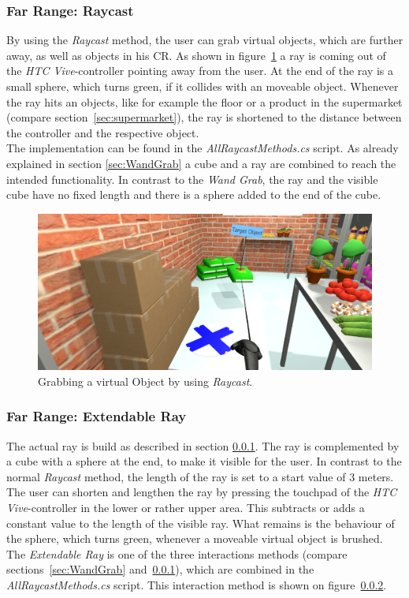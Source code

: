 \subsubsection{Far Range: Raycast} \label{sec:Raycast}
By using the \textit{Raycast} method, the user can grab virtual objects, which are further away, as well as objects in his CR. As shown in figure~\ref{fig:raycast} a ray is coming out of the \textit{HTC Vive}-controller pointing away from the user. At the end of the ray is a small sphere, which turns green, if it collides with an moveable object. Whenever the ray hits an objects, like for example the floor or a product in the supermarket (compare section~\ref{sec:supermarket}), the ray is shortened to the distance between the controller and the respective object. \\
The implementation can be found in the \textit{AllRaycastMethods.cs} script. As already explained in section \ref{sec:WandGrab} a cube and a ray are combined to reach the intended functionality. In contrast to the \textit{Wand Grab}, the ray and the visible cube have no fixed length and there is a sphere added to the end of the cube.

\begin{figure}[H] 
	\center 
	\includegraphics[width=12cm]{Images/Raycast.PNG}			
	\caption[Grabbing a virtual Object by using \textit{Raycast}.]{Grabbing a virtual Object by using \textit{Raycast}.}
	\label{fig:raycast}
\end{figure}


\subsubsection{Far Range: Extendable Ray} \label{sec:ExtendableRay}
The actual ray is build as described in section \ref{sec:Raycast}. The ray \cite{website:Ray} is complemented by a cube with a sphere at the end, to make it visible for the user. In contrast to the normal \textit{Raycast} method, the length of the ray is set to a start value of 3 meters. The user can shorten and lengthen the ray by pressing the touchpad of the \textit{HTC Vive}-controller in the lower or rather upper area. This subtracts or adds a constant value to the length of the visible ray. What remains is the behaviour of the sphere, which turns green, whenever a moveable virtual object is brushed. The \textit{Extendable Ray} is one of the three interactions methods (compare sections~\ref{sec:WandGrab} and~\ref{sec:Raycast}), which are combined in the \textit{AllRaycastMethods.cs} script. This interaction method is shown on figure~\ref{sec:ExtendableRay}.


